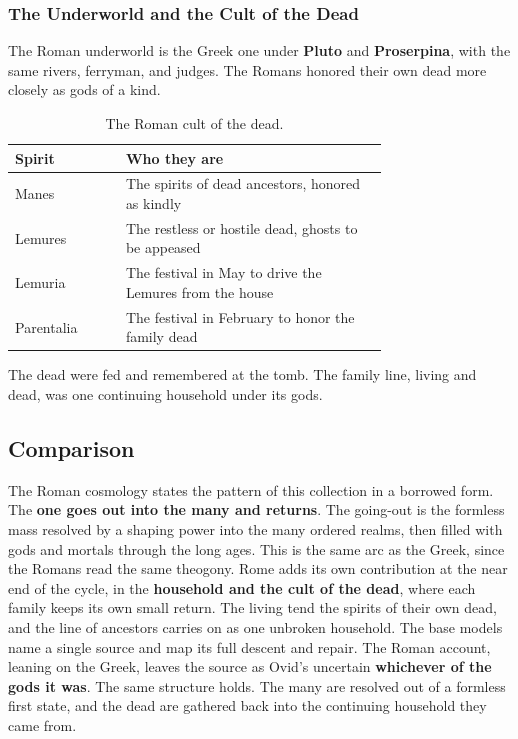 \subsubsection{The Underworld and the Cult of the Dead}

The Roman underworld is the Greek one under \textbf{Pluto} and \textbf{Proserpina},
with the same rivers, ferryman, and judges. The Romans honored their own dead
more closely as gods of a kind.

\begin{longtable}{L{0.22\linewidth} L{0.52\linewidth}}
\caption{The Roman cult of the dead.}\\
\toprule
\textbf{Spirit} & \textbf{Who they are} \\
\midrule
Manes & The spirits of dead ancestors, honored as kindly \\
Lemures & The restless or hostile dead, ghosts to be appeased \\
Lemuria & The festival in May to drive the Lemures from the house \\
Parentalia & The festival in February to honor the family dead \\
\bottomrule
\end{longtable}

The dead were fed and remembered at the tomb. The family line, living and dead,
was one continuing household under its gods.

\subsection{Comparison}

The Roman cosmology states the pattern of this collection in a borrowed form. The
\textbf{one goes out into the many and returns}. The going-out is the formless
mass resolved by a shaping power into the many ordered realms, then filled with
gods and mortals through the long ages. This is the same arc as the Greek, since
the Romans read the same theogony. Rome adds its own contribution at the near end
of the cycle, in the \textbf{household and the cult of the dead}, where each
family keeps its own small return. The living tend the spirits of their own dead,
and the line of ancestors carries on as one unbroken household. The base models
name a single source and map its full descent and repair. The Roman account,
leaning on the Greek, leaves the source as Ovid's uncertain \textbf{whichever of
the gods it was}. The same structure holds. The many are resolved out of a
formless first state, and the dead are gathered back into the continuing household
they came from.
